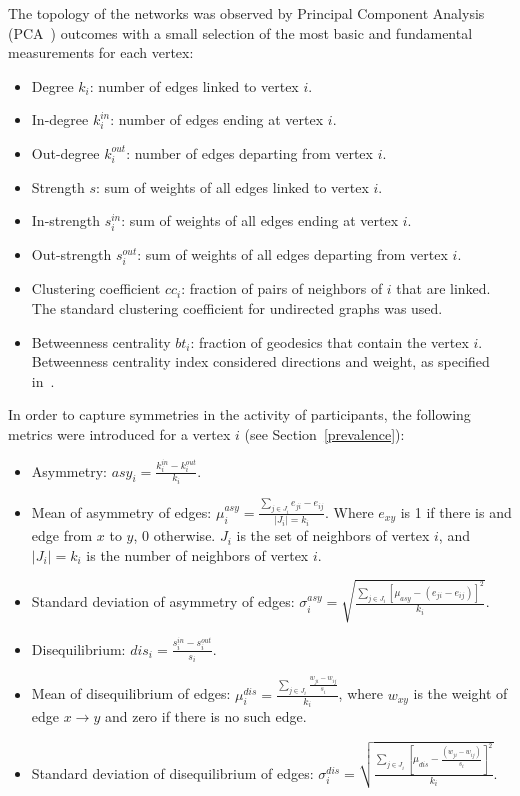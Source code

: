\documentclass[%
 aip,
 jmp,%
 amsmath,amssymb,
 reprint,%
]{revtex4-1}
\begin{document}
The topology of the networks was observed by Principal Component Analysis (PCA~\cite{pca}) outcomes
with a small selection of the most basic and fundamental measurements for each vertex:

\begin{itemize}
    \item Degree     $k_i$: number of edges linked to vertex $i$.
    \item In-degree  $k_i^{in}$: number of edges ending at vertex $i$.
    \item Out-degree $k_i^{out}$: number of edges departing from vertex $i$.
    \item Strength $s$: sum of weights of all edges linked to vertex $i$.
    \item In-strength $s_i^{in}$: sum of weights of all edges ending at vertex $i$.
    \item Out-strength $s_i^{out}$: sum of weights of all edges departing from vertex $i$.
    \item Clustering coefficient $cc_i$: fraction of pairs of neighbors of $i$ that are linked.  The standard clustering coefficient for undirected graphs was used.
    \item Betweenness centrality $bt_i$: fraction of geodesics that contain the vertex $i$. Betweenness centrality index considered directions and weight, as specified in~\cite{faster}.
\end{itemize}

In order to capture symmetries in the activity of participants, the following metrics were introduced for a vertex $i$ (see Section~\ref{prevalence}):

\begin{itemize}
    \item Asymmetry: $asy_i=\frac{k_i^{in}-k_i^{out}}{k_i}$.
    \item Mean of asymmetry of edges: $\mu_i^{asy}=\frac{\sum_{j\in J_i} e_{ji}-e_{ij}}{|J_i|=k_i}$. Where $e_{xy}$ is 1 if there is and edge from $x$ to $y$, $0$ otherwise. $J_i$ is the set of neighbors of vertex $i$, and $|J_i|=k_i$ is the number of neighbors of vertex $i$.
    \item Standard deviation of asymmetry of edges: $\sigma_i^{asy}=\sqrt{\frac{\sum_{j\in J_i}[\mu_{asy} -(e_{ji}-e_{ij}) ]^2  }{k_i}  }$.
    \item Disequilibrium: $dis_i=\frac{s_i^{in}-s_i^{out}}{s_i}$.
    \item Mean of disequilibrium of edges: $\mu_i^{dis}=\frac{\sum_{j \in J_i}\frac{w_{ji}-w_{ij}}{s_i}}{k_i}$, where $w_{xy}$ is the weight of edge $x\rightarrow y$ and zero if there is no such edge.
    \item Standard deviation of disequilibrium of edges: $\sigma_i^{dis}=\sqrt{\frac{\sum_{j\in J_i}[\mu_{dis}-\frac{(w_{ji}-w_{ij})}{s_i}]^2}{k_i}}$.
\end{itemize}
\end{document}
